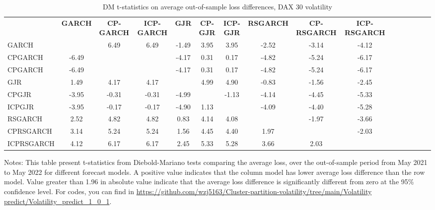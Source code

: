 \documentclass[preprint,12pt,authoryear]{elsarticle}
\begin{document}
\begin{table}
\begin{center}
\begin{threeparttable}
\centering \footnotesize
\caption{\footnotesize DM t-statistics on average out-of-sample loss differences, DAX 30 volatility}\label{tab38_1}
\begin{tabular}{l c c c c c c c c c c c c c c c}
\toprule
 & \textbf{GARCH} & \textbf{CP-GARCH} & \textbf{ICP-GARCH} & \textbf{GJR} & \textbf{CP-GJR} & \textbf{ICP-GJR}& \textbf{RSGARCH} & \textbf{CP-RSGARCH} & \textbf{ICP-RSGARCH}
 \\
\cmidrule{2-10}
GARCH      &       &  6.49 &  6.49 & -1.49 &  3.95 &  3.95 & -2.52 & -3.14 & -4.12 \\
CPGARCH    & -6.49 &       &       & -4.17 &  0.31 &  0.17 & -4.82 & -5.24 & -6.17 \\
CPGARCH    & -6.49 &       &       & -4.17 &  0.31 &  0.17 & -4.82 & -5.24 & -6.17 \\
GJR        &  1.49 &  4.17 &  4.17 &       &  4.99 &  4.90 & -0.83 & -1.56 & -2.45 \\
CPGJR      & -3.95 & -0.31 & -0.31 & -4.99 &       & -1.13 & -4.14 & -4.45 & -5.33 \\
ICPGJR     & -3.95 & -0.17 & -0.17 & -4.90 &  1.13 &       & -4.09 & -4.40 & -5.28 \\
RSGARCH    &  2.52 &  4.82 &  4.82 &  0.83 &  4.14 &  4.08 &       & -1.97 & -3.66 \\
CPRSGARCH  &  3.14 &  5.24 &  5.24 &  1.56 &  4.45 &  4.40 &  1.97 &       & -2.03 \\
ICPRSGARCH &  4.12 &  6.17 &  6.17 &  2.45 &  5.33 &  5.28 &  3.66 &  2.03 &       \\
\bottomrule
\end{tabular}
Notes: This table present t-statistics from Diebold-Mariano tests comparing the average loss, over the out-of-sample period from May 2021 to May 2022 for different forecast models. A positive value indicates that the column model has lower average loss difference than the row model. Value greater than 1.96 in absolute value indicate that the average loss difference is significantly different from zero at the 95\% confidence level.
For codes, you can find in
\url{https://github.com/wzj5163/Cluster-partition-volatility/tree/main/Volatility predict/Volatility_predict_1_0_1}.
\end{threeparttable}
\end{center}
\end{table}
\end{document}
